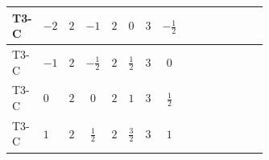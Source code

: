 \documentclass[8pt]{article}
\begin{document}
\begin{landscape}
\begin{longtable}{@{}llcccccc >{\raggedright\arraybackslash}p{0.21\linewidth} >{\raggedright\arraybackslash}p{0.21\linewidth} >{\raggedright\arraybackslash}p{0.21\linewidth}@{}}
\midrule
T3-C & $-2$ & $2$ & $-1$ & $2$ & $0$ & $3$ & $-\frac{1}{2}$ & \scriptsize\adjustbox{max width=\linewidth}{$\begin{gathered} - 3 C_{5} g_{2}^{2}\end{gathered}$} & \scriptsize\adjustbox{max width=\linewidth}{$\begin{gathered} 2 C_{5} \lambda_1\end{gathered}$} & \scriptsize\adjustbox{max width=\linewidth}{$\begin{gathered} - C_{5} Y_e Y_e^\dagger\end{gathered}$} \\
\midrule
T3-C & $-1$ & $2$ & $-\frac{1}{2}$ & $2$ & $\frac{1}{2}$ & $3$ & $0$ & \scriptsize\adjustbox{max width=\linewidth}{$\begin{gathered} - 3 C_{5} g_{2}^{2}\end{gathered}$} & \scriptsize\adjustbox{max width=\linewidth}{$\begin{gathered} 2 C_{5} \lambda_1\end{gathered}$} & \scriptsize\adjustbox{max width=\linewidth}{$\begin{gathered} - C_{5} Y_e Y_e^\dagger\end{gathered}$} \\
\midrule
T3-C & $0$ & $2$ & $0$ & $2$ & $1$ & $3$ & $\frac{1}{2}$ & \scriptsize\adjustbox{max width=\linewidth}{$\begin{gathered} - 3 C_{5} g_{2}^{2}\end{gathered}$} & \scriptsize\adjustbox{max width=\linewidth}{$\begin{gathered} 2 C_{5} \lambda_1\end{gathered}$} & \scriptsize\adjustbox{max width=\linewidth}{$\begin{gathered} - C_{5} Y_e Y_e^\dagger\end{gathered}$} \\
\midrule
T3-C & $1$ & $2$ & $\frac{1}{2}$ & $2$ & $\frac{3}{2}$ & $3$ & $1$ & \scriptsize\adjustbox{max width=\linewidth}{$\begin{gathered} - 3 C_{5} g_{2}^{2}\end{gathered}$} & \scriptsize\adjustbox{max width=\linewidth}{$\begin{gathered} 2 C_{5} \lambda_1\end{gathered}$} & \scriptsize\adjustbox{max width=\linewidth}{$\begin{gathered} - C_{5} Y_e Y_e^\dagger\end{gathered}$} \\

\end{longtable}
\end{landscape}
\end{document}
